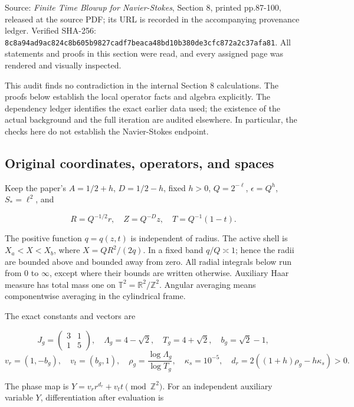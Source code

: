 \documentclass[10pt,a4paper]{article}
\begin{document}
Source: \emph{Finite Time Blowup for Navier-Stokes}, Section 8, printed pp.87-100, released at the source PDF; its URL is recorded in the accompanying provenance ledger. Verified SHA-256: \texttt{8c8a94ad\allowbreak 9ac824c8\allowbreak b605b982\allowbreak 7cadf7be\allowbreak aca48bd1\allowbreak 0b380de3\allowbreak cfc872a2\allowbreak c37afa81}. All statements and proofs in this section were read, and every assigned page was rendered and visually inspected.

This audit finds no contradiction in the internal Section 8 calculations. The proofs below establish the local operator facts and algebra explicitly. The dependency ledger identifies the exact earlier data used; the existence of the actual background and the full iteration are audited elsewhere. In particular, the checks here do not establish the Navier-Stokes endpoint.

\subsection{Original coordinates, operators, and spaces}

Keep the paper's \(A=1/2+h\), \(D=1/2-h\), fixed \(h>0\), \(Q=2^{-\ell}\), \(\epsilon=Q^h\), \(S_*=\ell^2\), and

\[
R=Q^{-1/2}r,\quad Z=Q^{-D}z,\quad T=Q^{-1}(1-t).
\]

The positive function \(q=q(z,t)\) is independent of radius. The active shell is \(X_a<X<X_b\), where \(X=QR^2/(2q)\). In a fixed band \(q/Q\asymp1\); hence the radii are bounded above and bounded away from zero. All radial integrals below run from \(0\) to \(\infty\), except where their bounds are written otherwise. Auxiliary Haar measure has total mass one on \(\mathbb T^2=\mathbb R^2/\mathbb Z^2\). Angular averaging means componentwise averaging in the cylindrical frame.

The exact constants and vectors are

\[
J_g=\begin{pmatrix}3&1\\1&5\end{pmatrix},\quad
\Lambda_g=4-\sqrt2,\quad T_g=4+\sqrt2,\quad
b_g=\sqrt2-1,
\]
\[
v_r=(1,-b_g),\quad v_t=(b_g,1),\quad
\rho_g=\frac{\log\Lambda_g}{\log T_g},\quad
\kappa_s=10^{-5},\quad
d_r=2((1+h)\rho_g-h\kappa_s)>0.
\]

The phase map is \(Y=v_r r^{d_r}+v_t t\pmod {\mathbb Z^2}\). For an independent auxiliary variable \(Y\), differentiation after evaluation is
\end{document}
